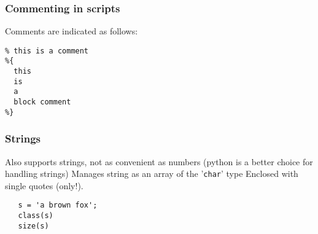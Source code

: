 \documentclass[11pt]{beamer}
\begin{document}
\begin{frame}[fragile]
  \frametitle{Commenting in scripts}
  \Enlarge

  \begin{enumerate}
  \myitem  Comments are indicated as follows:
  \end{enumerate}
  \begin{Verbatim}
% this is a comment
%{
  this 
  is 
  a 
  block comment
%}
  \end{Verbatim}
\end{frame}

\iffalse
\begin{frame}[fragile]
  \frametitle{Matrix multiplication}
  \Enlarge
  \begin{tikzpicture}[remember picture]
  \node[at=(current page.center)] {
                \texttt{[image: ./img/mult1.png]}
            };
  \end{tikzpicture}
\end{frame}

\begin{frame}[fragile]
  \frametitle{Matrix multiplication}
  \Enlarge
  \begin{tikzpicture}[remember picture]
  \node[at=(current page.center)] {
                \texttt{[image: ./img/mult2.png]}
            };
  \end{tikzpicture}
\end{frame}

\fi

\begin{frame}[fragile]
  \frametitle{Strings}
  \Enlarge

  \begin{enumerate}
  \myitem  Also supports strings, not as convenient as numbers (python is a better choice for handling strings) \pause
  \myitem Manages string as an array of the '\texttt{char}' type \pause
  \myitem  Enclosed with single quotes (only!).
  \end{enumerate}
  
  \begin{Verbatim}
   s = 'a brown fox';
   class(s)
   size(s)
  \end{Verbatim}
\end{frame}
\end{document}

